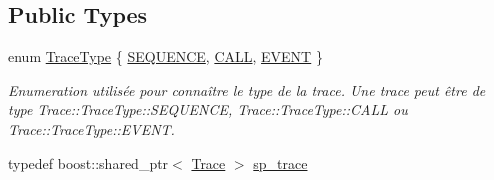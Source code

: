 \subsection*{Public Types}
\begin{DoxyCompactItemize}
\item 
enum \hyperlink{class_trace_a39e5f82f2243958348cc74d7cdae527c}{Trace\+Type} \{ \hyperlink{class_trace_a39e5f82f2243958348cc74d7cdae527caebbdad96feb25d8a1b79eafbfc0036c1}{S\+E\+Q\+U\+E\+N\+CE}, 
\hyperlink{class_trace_a39e5f82f2243958348cc74d7cdae527ca15e133d9a16235bbac953dbfa35a5368}{C\+A\+LL}, 
\hyperlink{class_trace_a39e5f82f2243958348cc74d7cdae527caf73b96a847b9877ca903e102074a52df}{E\+V\+E\+NT}
 \}\begin{DoxyCompactList}\small\item\em Enumeration utilisée pour connaître le type de la trace. Une trace peut être de type Trace\+::\+Trace\+Type\+::\+S\+E\+Q\+U\+E\+N\+CE, Trace\+::\+Trace\+Type\+::\+C\+A\+LL ou Trace\+::\+Trace\+Type\+::\+E\+V\+E\+NT. \end{DoxyCompactList}
\item 
typedef boost\+::shared\+\_\+ptr$<$ \hyperlink{class_trace}{Trace} $>$ \hyperlink{class_trace_a9c58e523529fc8a03fb6acf3eef86150}{sp\+\_\+trace}
\end{DoxyCompactItemize}
